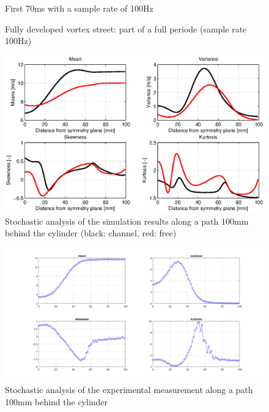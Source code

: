 \begin{figure}[!htb]
\centering
{}
\caption{First 70ms with a sample rate of 100Hz}
\label{fig:karman-ani1}
\end{figure} 

\begin{figure}[!htb]
\centering
{}
\caption{Fully developed vortex street: part of a full periode (sample rate 100Hz)}
\label{fig:karman-ani2}
\end{figure} 

\begin{figure}[!htb]
\centering
\includegraphics[trim=10 0 10 0,clip,width=1.0\textwidth]{FIGURES/karman-stoch.eps}
\caption{Stochastic analysis of the simulation results along a path 100mm behind the cylinder (black: channel, red: free)}
\label{fig:karman-stoch2}
\end{figure} 


\begin{figure}[!htb]
\centering
\includegraphics[trim=80 0 80 0,clip,width=1.0\textwidth]{FIGURES/wake-ana.png}
\caption{Stochastic analysis of the experimental measurement along a path 100mm behind the cylinder}
\label{fig:karman-stoch1}
\end{figure} 






